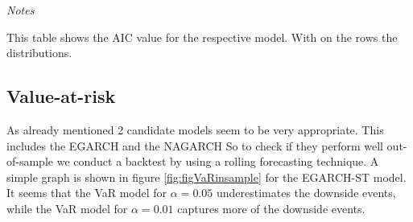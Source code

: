 \documentclass[a4paper, nobind]{templates/ociamthesis}
\begin{document}
\begin{table}[h!]

\caption{\label{tab:aicTable}Model selection according to AIC}
\centering
\begin{threeparttable}
\begin{tablenotes}
\item \textit{Notes} 
\item This table shows the AIC value for the respective model. With on the rows the distributions. 
\end{tablenotes}
\end{threeparttable}
\end{table}

\clearpage
\newpage

\hypertarget{value-at-risk-1}{%
\subsection{Value-at-risk}\label{value-at-risk-1}}

\noindent As already mentioned 2 candidate models seem to be very appropriate. This includes the EGARCH and the NAGARCH So to check if they perform well out-of-sample we conduct a backtest by using a rolling forecasting technique. A simple graph is shown in figure \ref{fig:figVaRinsample} for the EGARCH-ST model. It seems that the VaR model for \(\alpha=0.05\) underestimates the downside events, while the VaR model for \(\alpha=0.01\) captures more of the downside events.
\end{document}
